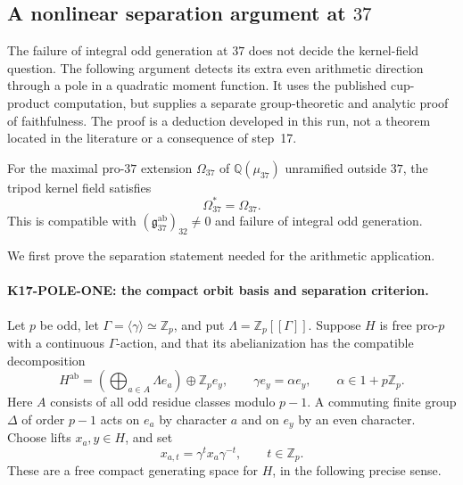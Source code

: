 \subsection{A nonlinear separation argument at \texorpdfstring{$37$}{37}}
\label{sec:kernel37-poles}

The failure of integral odd generation at $37$ does not decide the kernel-field question. The following argument detects its extra even arithmetic direction through a pole in a quadratic moment function. It uses the published cup-product computation, but supplies a separate group-theoretic and analytic proof of faithfulness. The proof is a deduction developed in this run, not a theorem located in the literature or a consequence of step~17.

\begin{theorem}[K17-37-KERNEL]\label{thm:kernel37-poles}
For the maximal pro-$37$ extension $\Omega_{37}$ of $\mathbb Q(\mu_{37})$ unramified outside $37$, the tripod kernel field satisfies
\[
 \Omega_{37}^*=\Omega_{37}.
\]
This is compatible with $(\mathfrak g_{37}^{\mathrm{ab}})_{32}\ne0$ and failure of integral odd generation.
\end{theorem}

We first prove the separation statement needed for the arithmetic application.

\paragraph{K17-POLE-ONE: the compact orbit basis and separation criterion.}
Let $p$ be odd, let $\Gamma=\langle\gamma\rangle\simeq\mathbb Z_p$, and put $\Lambda=\mathbb Z_p[[\Gamma]]$. Suppose $H$ is free pro-$p$ with a continuous $\Gamma$-action, and that its abelianization has the compatible decomposition
\[
 H^{\mathrm{ab}}=
 \left(\bigoplus_{a\in A}\Lambda e_a\right)\oplus\mathbb Z_p e_y,
 \qquad \gamma e_y=\alpha e_y,\qquad \alpha\in1+p\mathbb Z_p.       \tag{N.1}
\]
Here $A$ consists of all odd residue classes modulo $p-1$. A commuting finite group $\Delta$ of order $p-1$ acts on $e_a$ by character $a$ and on $e_y$ by an even character. Choose lifts $x_a,y\in H$, and set
\[
 x_{a,t}=\gamma^t x_a\gamma^{-t},\qquad t\in\mathbb Z_p.
\]
These are a free compact generating space for $H$, in the following precise sense.

